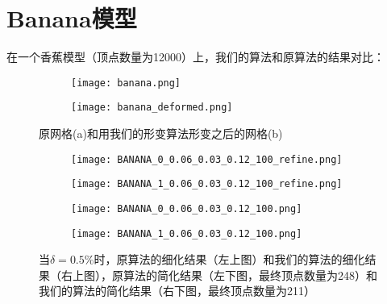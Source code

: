 \section{Banana模型}
在一个香蕉模型（顶点数量为12000）上，我们的算法和原算法的结果对比：
\begin{figure}[htbp]
  \centering
  \begin{subfigure}[b]{0.4\textwidth}
    \texttt{[image: banana.png]}
    \end{subfigure}
    \begin{subfigure}[b]{0.4\textwidth}
      \texttt{[image: banana\_deformed.png]}
    \end{subfigure}
    \caption[banana形变结果]{原网格(a)和用我们的形变算法形变之后的网格(b)}
    \label{fig:banana-deform}
\end{figure}

\begin{figure}[htbp]
  \centering
  \begin{subfigure}[b]{0.4\textwidth}
    \texttt{[image: BANANA\_0\_0.06\_0.03\_0.12\_100\_refine.png]}
  \end{subfigure}
  \begin{subfigure}[b]{0.4\textwidth}
    \texttt{[image: BANANA\_1\_0.06\_0.03\_0.12\_100\_refine.png]}
  \end{subfigure}
  \begin{subfigure}[b]{0.4\textwidth}
    \texttt{[image: BANANA\_0\_0.06\_0.03\_0.12\_100.png]}
  \end{subfigure}
  \begin{subfigure}[b]{0.4\textwidth}
    \texttt{[image: BANANA\_1\_0.06\_0.03\_0.12\_100.png]}
  \end{subfigure}
  \caption[当$\delta=0.5\%$时banana结果对比]{当$\delta=0.5\%$时，原算法的细化结果（左上图）和我们的算法的细化结果（右上图），原算法的简化结果（左下图，最终顶点数量为248）和我们的算法的简化结果（右下图，最终顶点数量为211）}
  \label{fig:banana-res1}
\end{figure}

